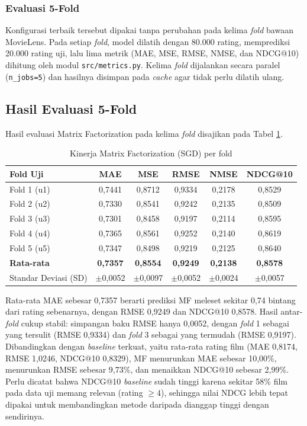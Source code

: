 \subsubsection{Evaluasi 5-Fold}
Konfigurasi terbaik tersebut dipakai tanpa perubahan pada kelima \textit{fold} bawaan MovieLens. Pada setiap \textit{fold}, model dilatih dengan 80.000 rating, memprediksi 20.000 rating uji, lalu lima metrik (MAE, MSE, RMSE, NMSE, dan NDCG@10) dihitung oleh modul \texttt{src/metrics.py}. Kelima \textit{fold} dijalankan secara paralel (\texttt{n\_jobs=5}) dan hasilnya disimpan pada \textit{cache} agar tidak perlu dilatih ulang.

\subsection{Hasil Evaluasi 5-Fold}
Hasil evaluasi Matrix Factorization pada kelima \textit{fold} disajikan pada Tabel \ref{tab:hasil_mf}.

\begin{table}[htbp]
\centering
\caption{Kinerja Matrix Factorization (SGD) per fold}
\label{tab:hasil_mf}
\footnotesize
\setlength{\tabcolsep}{4pt}
\begin{tabular}{l c c c c c}
\toprule
\textbf{Fold Uji} & \textbf{MAE} & \textbf{MSE} & \textbf{RMSE} & \textbf{NMSE} & \textbf{NDCG@10} \\
\midrule
Fold 1 (u1) & 0,7441 & 0,8712 & 0,9334 & 0,2178 & 0,8529 \\
Fold 2 (u2) & 0,7330 & 0,8541 & 0,9242 & 0,2135 & 0,8509 \\
Fold 3 (u3) & 0,7301 & 0,8458 & 0,9197 & 0,2114 & 0,8595 \\
Fold 4 (u4) & 0,7365 & 0,8561 & 0,9252 & 0,2140 & 0,8619 \\
Fold 5 (u5) & 0,7347 & 0,8498 & 0,9219 & 0,2125 & 0,8640 \\
\midrule
\textbf{Rata-rata} & \textbf{0,7357} & \textbf{0,8554} & \textbf{0,9249} & \textbf{0,2138} & \textbf{0,8578} \\
Standar Deviasi (SD) & $\pm$0,0052 & $\pm$0,0097 & $\pm$0,0052 & $\pm$0,0024 & $\pm$0,0057 \\
\bottomrule
\end{tabular}
\end{table}

Rata-rata MAE sebesar 0,7357 berarti prediksi MF meleset sekitar 0,74 bintang dari rating sebenarnya, dengan RMSE 0,9249 dan NDCG@10 0,8578. Hasil antar-\textit{fold} cukup stabil: simpangan baku RMSE hanya 0,0052, dengan \textit{fold} 1 sebagai yang tersulit (RMSE 0,9334) dan \textit{fold} 3 sebagai yang termudah (RMSE 0,9197). Dibandingkan dengan \textit{baseline} terkuat, yaitu rata-rata rating film (MAE 0,8174, RMSE 1,0246, NDCG@10 0,8329), MF menurunkan MAE sebesar 10,00\%, menurunkan RMSE sebesar 9,73\%, dan menaikkan NDCG@10 sebesar 2,99\%. Perlu dicatat bahwa NDCG@10 \textit{baseline} sudah tinggi karena sekitar 58\% film pada data uji memang relevan (rating $\ge 4$), sehingga nilai NDCG lebih tepat dipakai untuk membandingkan metode daripada dianggap tinggi dengan sendirinya.


